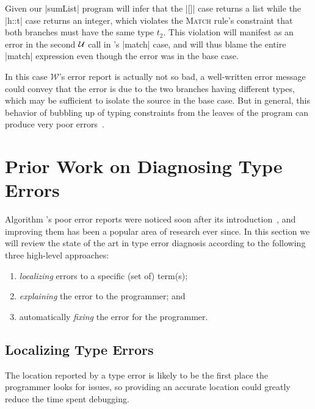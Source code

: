 Given our |sumList| program \W will infer that the |[]| case
returns a list while the |h::t| case returns an integer, which violates
the \textsc{Match} rule's constraint that both branches must have the
same type $t_2$.
%
This violation will manifest as an error in the second $\mathcal{U}$
call in \W's |match| case, and \W will thus blame
the entire |match| expression
even though the error was in the base case.

In this case $\mathcal{W}$'s error report is actually not so
bad, a well-written error message could convey that the error is due to
the two branches having different types, which may be sufficient to
isolate the source in the base case.
%
But in general, this behavior of bubbling up of typing constraints from
the leaves of the program can produce very poor errors~\citep[see
Fig. 1 for a particularly pathological example]{Lee1998-ys}.


\section{Prior Work on Diagnosing Type Errors}
\label{sec:diagnosing-type-errors}
Algorithm \W's poor error reports were noticed soon after its
introduction~\citep{Wand1986-nw}, and improving them has been a popular
area of research ever since.
%
In this section we will review the state of the art in type error
diagnosis according to the following three high-level approaches:
\begin{enumerate}
\item \emph{localizing} errors to a specific (set of) term(s);
\item \emph{explaining} the error to the programmer; and
\item automatically \emph{fixing} the error for the programmer.
\end{enumerate}

\subsection{Localizing Type Errors}
\label{sec:localizing-type-errors}
The location reported by a type error is likely to be the first place
the programmer looks for issues, so providing an accurate %
location could greatly reduce the time spent debugging.

